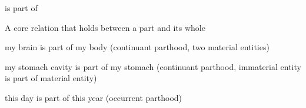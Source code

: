 \documentclass[letterpaper,10pt,english]{sphinxmanual}
\begin{document}
\begin{sphinxShadowBox}

\sphinxAtStartPar
is part of
\end{sphinxShadowBox}

\begin{sphinxShadowBox}

\sphinxAtStartPar
{\hyperref[\detokenize{doc-RO_0002131::doc}]{}}
\end{sphinxShadowBox}

\begin{sphinxShadowBox}

\sphinxAtStartPar
A core relation that holds between a part and its whole
\end{sphinxShadowBox}

\begin{sphinxShadowBox}

\sphinxAtStartPar
my brain is part of my body (continuant parthood, two material entities)

\sphinxAtStartPar
my stomach cavity is part of my stomach (continuant parthood, immaterial entity is part of material entity)

\sphinxAtStartPar
this day is part of this year (occurrent parthood)
\end{sphinxShadowBox}
\end{document}
